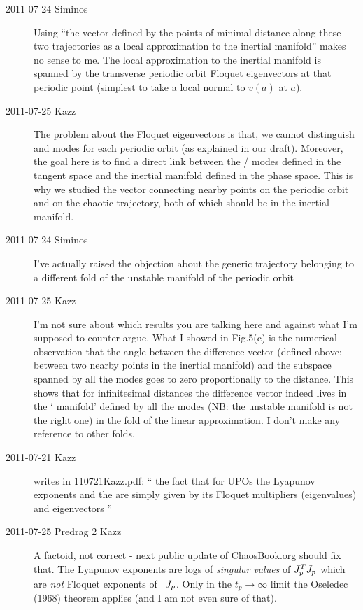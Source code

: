 \begin{description}
\item[2011-07-24 Siminos]
    Using ``the vector defined by the points of minimal distance along
    these two trajectories as a local approximation to the inertial
    manifold'' makes no sense to me. The local approximation to the
    inertial manifold is spanned by the transverse periodic orbit Floquet
    eigenvectors at that periodic point (simplest to take a local
    {\PoincSec} normal to $v(a)$ at $a$).

\item[2011-07-25 Kazz]
The problem about the Floquet eigenvectors is that, we cannot distinguish
{\entangled} and {\transient} modes for each periodic orbit (as explained in our
draft). Moreover, the goal here is to find a direct link between the
{\entangled}/{\transient} modes defined in the tangent space and the inertial
manifold defined in the phase space. This is why we studied the vector
connecting nearby points on the periodic orbit and on the chaotic
trajectory, both of which should be in the inertial manifold.

\item[2011-07-24 Siminos]
    I've actually raised the objection about the generic trajectory
    belonging to a different fold of the unstable manifold of the
    periodic orbit

\item[2011-07-25 Kazz]
I'm not sure about which results you are talking here and against what
I'm supposed to counter-argue. What I showed in Fig.5(c) is the numerical
observation that the angle between the difference vector (defined above;
between two nearby points in the inertial manifold) and the subspace
spanned by all the {\entangled} modes goes to zero proportionally to the
distance. This shows that for infinitesimal distances the difference
vector indeed lives in the `{\entangled} manifold' defined by all the
{\entangled} modes (NB: the unstable manifold is not the right one) in the
fold of the linear approximation. I don't make any reference to other
folds.

\item[2011-07-21 Kazz] writes in 110721Kazz.pdf:
``
the fact that for UPOs the Lyapunov exponents and the
{\cLvs} are simply given by its Floquet multipliers (eigenvalues)
and eigenvectors
''

\item[2011-07-25 Predrag 2 Kazz]
A factoid, not correct - next public update of ChaosBook.org should fix
that. The Lyapunov exponents are logs of \emph{singular values} of
$J^{T}_pJ_p$ which are \emph{not} Floquet exponents of
\jacobianM\ $J_p$. Only in the $t_p \to \infty$ limit the Oseledec
(1968) theorem applies (and I am not even sure of that).


\end{description}
